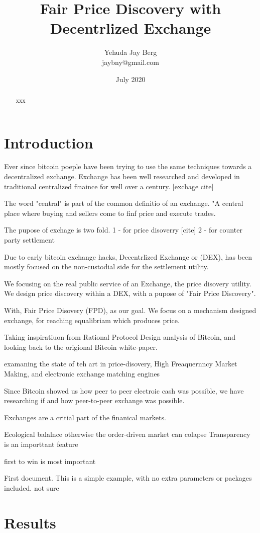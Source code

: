 \documentclass[12pt]{article}
\title{Fair Price Discovery with Decentrlized Exchange}
\author{Yehuda Jay Berg \\jaybny@gmail.com}
\date{July 2020}
\begin{document}
\parindent 0cm
\parskip   6pt
\maketitle




\begin{abstract}
    xxx
\end{abstract}

\section{Introduction}
Ever since bitcoin poeple have been trying to use the same techniques towards a decentralized exchange. Exchange has been well researched and developed in traditional centralized finaince for well over a century. [exchage cite] 

The word "central" is part of the common definitio of an exchange. "A central place where buying and sellers come to finf price and execute trades. 

The pupose of exchage is two fold. 1 - for price disoverry [cite]  2 - for counter party settlement 

Due to early bitcoin exchange hacks, Decentrlized Exchange or (DEX), has been mostly focused on the non-custodial side for the settlement utility. 

We focusing on the real public service of an Exchange, the price disovery utility. We design price discovery within a DEX, with a pupose of "Fair Price Discovery". 

With, Fair Price Disovery (FPD), as our goal. We focus on a mechanism designed exchange, for reaching equalibriam which produces price. 

Taking inspiratiuon from Rational Protocol Design analysis of Bitcoin, and looking back to the origional Bitcoin white-paper. 


examaning the state of teh art in price-disovery, High Freaquernncy Market Making, and electronic exchange matching engines  

Since Bitcoin showed us how peer to peer electroic cash was possible, we have researching if and how peer-to-peer exchange was possible. 

Exchanges are a critial part of the finanical markets.  

Ecological balalnce otherwise the order-driven market can colapse 
Transparency is an importtant feature 

first to win is most important 

First document. This is a simple example, with no 
extra parameters or packages included. not sure
\section{Results}
\end{document}
